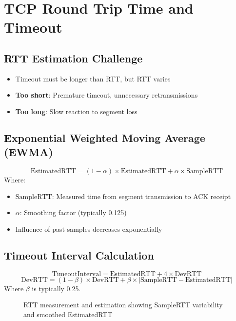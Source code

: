 \documentclass[12pt]{article}
\begin{document}
\section{TCP Round Trip Time and Timeout}

\subsection{RTT Estimation Challenge}
\begin{itemize}
    \item Timeout must be longer than RTT, but RTT varies
    \item \textbf{Too short}: Premature timeout, unnecessary retransmissions
    \item \textbf{Too long}: Slow reaction to segment loss
\end{itemize}

\subsection{Exponential Weighted Moving Average (EWMA)}
\[
    \text{EstimatedRTT} = (1 - \alpha) \times \text{EstimatedRTT} + \alpha \times \text{SampleRTT}
\]
Where:
\begin{itemize}
    \item $\text{SampleRTT}$: Measured time from segment transmission to ACK receipt
    \item $\alpha$: Smoothing factor (typically 0.125)
    \item Influence of past samples decreases exponentially
\end{itemize}

\subsection{Timeout Interval Calculation}
\[
    \text{TimeoutInterval} = \text{EstimatedRTT} + 4 \times \text{DevRTT}
\]
\[
    \text{DevRTT} = (1 - \beta) \times \text{DevRTT} + \beta \times |\text{SampleRTT} - \text{EstimatedRTT}|
\]
Where $\beta$ is typically 0.25.

\begin{figure}[h]
    \centering
    \caption{RTT measurement and estimation showing SampleRTT variability and smoothed EstimatedRTT}
    \label{fig:rtt_estimation}
\end{figure}
\end{document}
